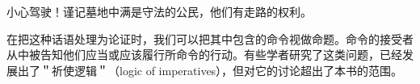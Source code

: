 \begin{displayquote}
小心驾驶！谨记墓地中满是守法的公民，他们有走路的权利。\cite{lander1988}
\end{displayquote}

在把这种话语处理为论证时，我们可以把其中包含的命令视做命题。命令的接受者从中被告知他们应当或应该履行所命令的行动。有些学者研究了这类问题，已经发展出了＂祈使逻辑＂（logic of imperatives），但对它的讨论超出了本书的范围。\cite{rescher1996}


